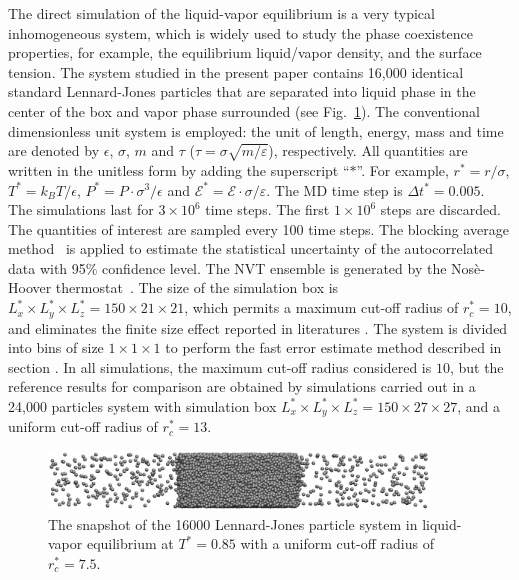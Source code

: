 \documentclass[aps,pre,preprint]{revtex4-1}
\begin{document}
The direct simulation of the liquid-vapor equilibrium is a very
typical inhomogeneous system, which is widely used to study the phase
coexistence properties, for example, the equilibrium liquid/vapor
density, and the surface tension. The system studied in the present
paper contains 16,000 identical standard Lennard-Jones particles that are
separated into liquid phase in the center of the box and vapor phase
surrounded (see Fig.~\ref{fig:tmp1}).  The conventional dimensionless
unit system is employed: the unit of length, energy, mass and time are
denoted by $\epsilon$, $\sigma$, $m$ and $\tau$ ($\tau =
\sigma\sqrt{m/\varepsilon}$), respectively.  All quantities are
written in the unitless form by adding the superscript ``$\ast$''.
For example, $r^\ast = r / \sigma$, $T^\ast = k_BT / \epsilon$,
$P^\ast = P\cdot \sigma^3 / \epsilon$ and $\mathcal E^\ast = \mathcal
E\cdot\sigma/\varepsilon$.  The MD time step {is} $\Delta t^\ast =
0.005$. The simulations last for $3\times 10^6$ time steps. The first
$1\times 10^6$ steps are discarded. The quantities of interest are
sampled every 100 time steps. The blocking average
method~\cite{flyvbjerg1989error} is applied to estimate the
statistical uncertainty of the autocorrelated data with 95\%
confidence level. The NVT ensemble is generated by the Nos\`e-Hoover
thermostat~\cite{nose1984molecular, hoover1985canonical}.  The size of
the simulation box is $L_x^\ast \times L_y^\ast \times L_z^\ast =
150\times 21\times 21$, which permits a maximum cut-off radius of
$r_c^\ast = 10$, and eliminates the finite size effect reported in
literatures \cite{chen1995area, orea2005oscillatory,
  biscay2009calculation}.
The system is divided into bins of size $1\times1\times1$ to perform the fast error
estimate method described in section \label{sec:tmp1.3}.
In all simulations, the maximum cut-off
radius considered is $10$, but the reference results for comparison
are obtained by simulations carried out in a 24,000 particles system
with simulation box $L_x^\ast \times L_y^\ast \times L_z^\ast =
150\times 27\times 27$, and a uniform cut-off radius of $r_c^\ast =
13$.

\begin{figure}
  \centering
  \includegraphics[width=0.9\textwidth]{fig/t0.85-n16000-rc07.5uni/confout.eps}
  \caption{The snapshot of the 16000 Lennard-Jones particle system in
    liquid-vapor equilibrium at $T^\ast=0.85$ with a uniform cut-off
    radius of $r_c^\ast = 7.5$.}
  \label{fig:tmp1}
\end{figure}
\end{document}
